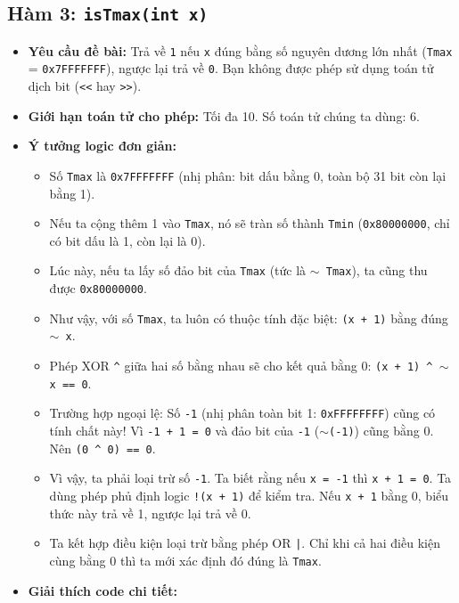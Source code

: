 \documentclass[12pt, a4paper]{article}
\begin{document}
\subsection{Hàm 3: \texttt{isTmax(int x)}}
\begin{itemize}
    \item \textbf{Yêu cầu đề bài:} Trả về \texttt{1} nếu \texttt{x} đúng bằng số nguyên dương lớn nhất (\texttt{Tmax} = \texttt{0x7FFFFFFF}), ngược lại trả về \texttt{0}. Bạn không được phép sử dụng toán tử dịch bit (\texttt{<<} hay \texttt{>>}).
    \item \textbf{Giới hạn toán tử cho phép:} Tối đa 10. Số toán tử chúng ta dùng: 6.
    \item \textbf{Ý tưởng logic đơn giản:}
    \begin{itemize}
        \item Số \texttt{Tmax} là \texttt{0x7FFFFFFF} (nhị phân: bit dấu bằng 0, toàn bộ 31 bit còn lại bằng 1).
        \item Nếu ta cộng thêm 1 vào \texttt{Tmax}, nó sẽ tràn số thành \texttt{Tmin} (\texttt{0x80000000}, chỉ có bit dấu là 1, còn lại là 0).
        \item Lúc này, nếu ta lấy số đảo bit của \texttt{Tmax} (tức là \texttt{\(\sim\) Tmax}), ta cũng thu được \texttt{0x80000000}.
        \item Như vậy, với số \texttt{Tmax}, ta luôn có thuộc tính đặc biệt: \texttt{(x + 1)} bằng đúng \texttt{\(\sim\) x}.
        \item Phép XOR \texttt{\textasciicircum} giữa hai số bằng nhau sẽ cho kết quả bằng 0: \texttt{(x + 1) \textasciicircum\ \(\sim\) x == 0}.
        \item Trường hợp ngoại lệ: Số \texttt{-1} (nhị phân toàn bit 1: \texttt{0xFFFFFFFF}) cũng có tính chất này! Vì \texttt{-1 + 1 = 0} và đảo bit của \texttt{-1} (\texttt{\(\sim\)(-1)}) cũng bằng 0. Nên \texttt{(0 \textasciicircum\ 0) == 0}.
        \item Vì vậy, ta phải loại trừ số \texttt{-1}. Ta biết rằng nếu \texttt{x = -1} thì \texttt{x + 1 = 0}. Ta dùng phép phủ định logic \texttt{!(x + 1)} để kiểm tra. Nếu \texttt{x + 1} bằng 0, biểu thức này trả về 1, ngược lại trả về 0.
        \item Ta kết hợp điều kiện loại trừ bằng phép OR \texttt{|}. Chỉ khi cả hai điều kiện cùng bằng 0 thì ta mới xác định đó đúng là \texttt{Tmax}.
    \end{itemize}
    \item \textbf{Giải thích code chi tiết:}



\end{itemize}
\end{document}
